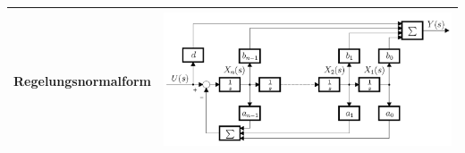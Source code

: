 \begin{center}
\begin{tabu}{|p{0.25\textwidth}|p{0.7\textwidth}|}
	\hline
	\vspace*{-0.5cm}Regelungsnormalform
		& \includegraphics[width = \linewidth, height = 4cm, trim = 0 0 0 -5]{./images/regelungsnormalform}\vspace*{-0.5cm}\\[2mm]
	\hline
	\end{tabu}
\end{center}
\clearpage
